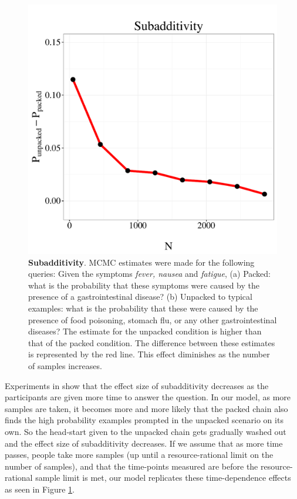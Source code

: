 \begin{figure}
\centering
\includegraphics[scale = 0.5]{figures/sub.pdf}
\caption{\textbf{Subadditivity}. MCMC estimates were made for the following queries: Given the symptoms \emph{fever, nausea} and \emph{fatigue}, (a) Packed: what is the probability that these symptoms were caused by the presence of a gastrointestinal disease? (b) Unpacked to typical examples: what is the probability that these were caused by the presence of food poisoning, stomach flu, or any other gastrointestinal diseases? The estimate for the unpacked condition is higher than that of the packed condition. The difference between these estimates is represented by the red line. This effect diminishes as the number of samples increases.}
\label{fig:subadd}
\end{figure}

Experiments in \cite{Dougherty2003} show that the effect size of subadditivity decreases as the participants are given more time to answer the question. In our model, as more samples are taken, it becomes more and more likely that the packed chain also finds the high probability examples prompted in the unpacked scenario on its own. So the head-start given to the unpacked chain gets gradually washed out and the effect size of subadditivity decreases. If we assume that as more time passes, people take more samples (up until a resource-rational limit on the number of samples), and that the time-points measured are before the resource-rational sample limit is met, our model replicates these time-dependence effects as seen in Figure \ref{fig:subadd}.

